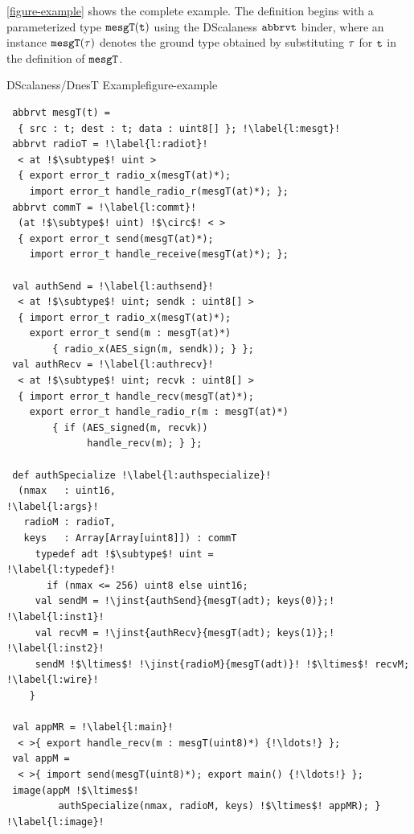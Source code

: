\autoref{figure-example} shows the complete example. The definition begins with a
parameterized type $\tt{mesgT(t)}$ using the DScalaness $\tt{abbrvt}$ binder, where an instance
$\tt{mesgT}(\t)$ denotes the ground type obtained by substituting $\t$ for $\tt{t}$ in the
definition of $\tt{mesgT}$.

\begin{fpfig}[!p]{DScalaness/DnesT Example}{figure-example}
{
\singlespace
\lstset{numbers=left, numberstyle=\tiny, numbersep=0pt, basicstyle=\ttfamily}
\lstset{escapechar=!, language=scalaness}
\begin{lstlisting}
 abbrvt mesgT(t) =
  { src : t; dest : t; data : uint8[] }; !\label{l:mesgt}!
 abbrvt radioT = !\label{l:radiot}!
  < at !$\subtype$! uint >
  { export error_t radio_x(mesgT(at)*); 
    import error_t handle_radio_r(mesgT(at)*); };
 abbrvt commT = !\label{l:commt}!
  (at !$\subtype$! uint) !$\circ$! < >
  { export error_t send(mesgT(at)*); 
    import error_t handle_receive(mesgT(at)*); };

 val authSend = !\label{l:authsend}!
  < at !$\subtype$! uint; sendk : uint8[] >
  { import error_t radio_x(mesgT(at)*);
    export error_t send(m : mesgT(at)*) 
        { radio_x(AES_sign(m, sendk)); } };
 val authRecv = !\label{l:authrecv}!
  < at !$\subtype$! uint; recvk : uint8[] >  
  { import error_t handle_recv(mesgT(at)*);
    export error_t handle_radio_r(m : mesgT(at)*) 
        { if (AES_signed(m, recvk))
              handle_recv(m); } }; 

 def authSpecialize !\label{l:authspecialize}!
  (nmax   : uint16,                                                     !\label{l:args}!
   radioM : radioT,
   keys   : Array[Array[uint8]]) : commT
     typedef adt !$\subtype$! uint =                                    !\label{l:typedef}!
       if (nmax <= 256) uint8 else uint16;
     val sendM = !\jinst{authSend}{mesgT(adt); keys(0)};!               !\label{l:inst1}!
     val recvM = !\jinst{authRecv}{mesgT(adt); keys(1)};!               !\label{l:inst2}!    
     sendM !$\ltimes$! !\jinst{radioM}{mesgT(adt)}! !$\ltimes$! recvM;  !\label{l:wire}!
    }

 val appMR = !\label{l:main}!
  < >{ export handle_recv(m : mesgT(uint8)*) {!\ldots!} }; 
 val appM = 
  < >{ import send(mesgT(uint8)*); export main() {!\ldots!} };  
 image(appM !$\ltimes$!
         authSpecialize(nmax, radioM, keys) !$\ltimes$! appMR); } !\label{l:image}!  
\end{lstlisting}
\primaryspacing
}
\end{fpfig}

